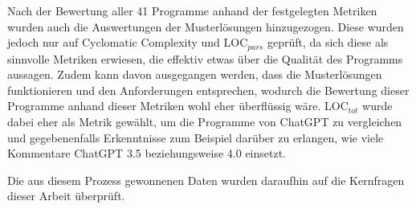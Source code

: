 \documentclass[class=scrbook, crop=false]{standalone}
\begin{document}
    Nach der Bewertung aller 41 Programme anhand der festgelegten Metriken wurden auch die Auswertungen der Musterlösungen hinzugezogen.
    Diese wurden jedoch nur auf Cyclomatic Complexity und LOC$_{pars}$ geprüft, da sich diese als sinnvolle Metriken erwiesen, die effektiv etwas über die
    Qualität des Programms aussagen.
    Zudem kann davon ausgegangen werden, dass die Musterlösungen funktionieren und den Anforderungen entsprechen, wodurch die Bewertung dieser Programme anhand
    dieser Metriken wohl eher überflüssig wäre.
    LOC$_{tot}$ wurde dabei eher als Metrik gewählt, um die Programme von ChatGPT zu vergleichen und gegebenenfalls Erkenntnisse zum Beispiel darüber zu erlangen,
    wie viele Kommentare ChatGPT 3.5 beziehungsweise 4.0 einsetzt.

    Die aus diesem Prozess gewonnenen Daten wurden daraufhin auf die Kernfragen dieser Arbeit überprüft.
\end{document}
